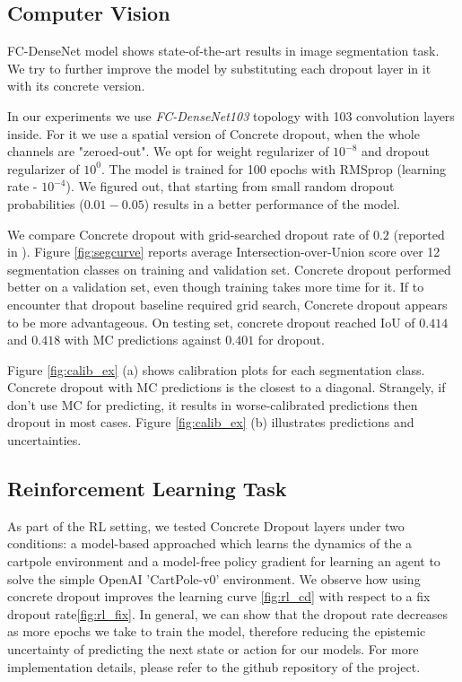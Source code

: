 \documentclass{article}
\begin{document}
\subsection{Computer Vision}

FC-DenseNet model \cite{densenet} shows state-of-the-art results in image segmentation task. We try to further improve the model by substituting each dropout layer in it with its concrete version.

In our experiments we use \textit{FC-DenseNet103} topology with 103 convolution layers inside. For it we use a spatial version of Concrete dropout, when the whole channels are "zeroed-out". We opt for weight regularizer of $10^{-8}$ and dropout regularizer of $10^0$. The model is trained for 100 epochs with RMSprop (learning rate - $10^{-4}$). We figured out, that starting from small random dropout probabilities ($0.01-0.05$) results in a better performance of the model.

We compare Concrete dropout with grid-searched dropout rate of $0.2$ (reported in \cite{densenet}). Figure \ref{fig:segcurve} reports average Intersection-over-Union score over 12 segmentation classes on training and validation set. Concrete dropout performed better on a validation set, even though training takes more time for it. If to encounter that dropout baseline required grid search, Concrete dropout appears to be more advantageous. On testing set, concrete dropout reached IoU of $0.414$ and $0.418$ with MC predictions against $0.401$ for dropout.

Figure \ref{fig:calib_ex} (a) shows calibration plots for each segmentation class. Concrete dropout with MC predictions is the closest to a diagonal. Strangely, if don't use MC for predicting, it results in worse-calibrated predictions then dropout in most cases. Figure \ref{fig:calib_ex} (b) illustrates predictions and uncertainties.

\subsection{Reinforcement Learning Task}

As part of the RL setting, we tested Concrete Dropout layers under two conditions: a model-based approached which learns the dynamics of the a cartpole environment and a model-free policy gradient for learning an agent to solve the simple OpenAI 'CartPole-v0' environment. We observe how using concrete dropout improves the learning curve \ref{fig:rl_cd} with respect to a fix dropout rate\ref{fig:rl_fix}. In general, we can show that the dropout rate decreases as more epochs we take to train the model, therefore reducing the epistemic uncertainty of predicting the next state or action for our models. For more implementation details, please refer to the github repository of the project. 
\end{document}
